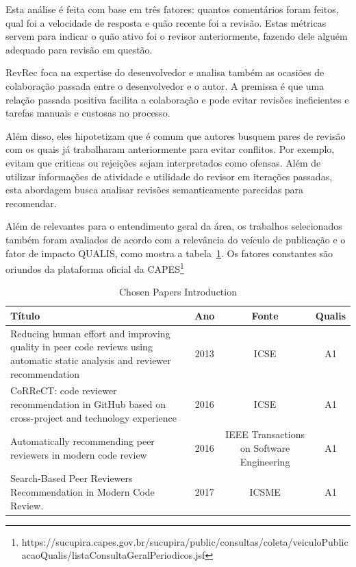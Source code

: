 \documentclass[a4paper,12pt]{monografia}
\theoremstyle{plain}
\theoremstyle{definition}
\theoremstyle{remark}
\begin{document}
Esta análise é feita com base em três fatores: quantos comentários foram feitos, qual foi a velocidade de resposta e quão recente foi a revisão. Estas métricas servem para indicar o quão ativo foi o revisor anteriormente, fazendo dele alguém adequado para revisão em questão.

RevRec \cite{ouni2016} foca na expertise do desenvolvedor e analisa também as ocasiões de colaboração passada entre o desenvolvedor e o autor. A premissa é que uma relação passada positiva facilita a colaboração e pode evitar revisões ineficientes e tarefas manuais e custosas no processo.

Além disso, eles hipotetizam que é comum que autores busquem pares de revisão com os quais já trabalharam anteriormente para evitar conflitos. Por exemplo, evitam que criticas ou rejeições sejam interpretados como ofensas. Além de utilizar informações de atividade e utilidade do revisor em iterações passadas, esta abordagem busca analisar revisões semanticamente parecidas para recomendar.


Além de relevantes para o entendimento geral da área, os trabalhos selecionados também foram avaliados de acordo com a relevância do veículo de publicação e o fator de impacto QUALIS, como mostra a tabela~\ref{tab:presentation}. Os fatores constantes são oriundos da plataforma oficial da CAPES\footnote{https://sucupira.capes.gov.br/sucupira/public/consultas/coleta/veiculoPublicacaoQualis/listaConsultaGeralPeriodicos.jsf}


\begin{table}[!h]
\centering
\begin{tabularx}{\columnwidth}{|X|c|c|c|}
\toprule
\hline
Título                                                                                                                        & Ano & Fonte                               & Qualis &  \\
\hline
Reducing human effort and improving quality in peer code reviews using automatic static analysis and reviewer recommendation & 2013 & ICSE                                      & A1            &  \\
CoRReCT: code reviewer recommendation in GitHub based on cross-project and technology experience                             & 2016 & ICSE                                      & A1            &  \\
Automatically recommending peer reviewers in modern code review                                                              & 2016 & IEEE Transactions on Software Engineering & A1            &  \\
Search-Based Peer Reviewers Recommendation in Modern Code Review.                                                            & 2017 & ICSME                                  & A1            &  \\ \bottomrule
\hline

\end{tabularx}%
\caption{Chosen Papers Introduction}
\label{tab:presentation}
\end{table}
\end{document}
